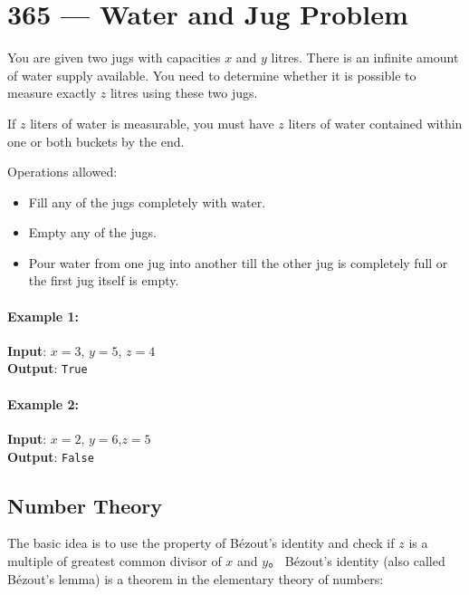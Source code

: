 \section{365 --- Water and Jug Problem}
You are given two jugs with capacities $ x $ and $ y $ litres. There is an infinite amount of water supply available. You need to determine whether it is possible to measure exactly $ z $ litres using these two jugs.

If $ z $ liters of water is measurable, you must have $ z $ liters of water contained within one or both buckets by the end.

Operations allowed:

\begin{itemize}
\item Fill any of the jugs completely with water.
\item Empty any of the jugs.
\item Pour water from one jug into another till the other jug is  completely full or the first jug itself is empty.
\end{itemize}

\paragraph{Example 1: }

\begin{flushleft}
\textbf{Input}: $ x = 3 $, $ y = 5 $, $ z = 4 $
\\
\textbf{Output}: \texttt{True}
\end{flushleft}

\paragraph{Example 2:}

\begin{flushleft}
\textbf{Input}: $ x = 2 $, $  y = 6 $,$  z = 5 $
\\
\textbf{Output}: \texttt{False}
\end{flushleft}

\subsection{Number Theory}
The basic idea is to use the property of B\'{e}zout's identity and check if $ z $ is a multiple of greatest common divisor of $ x $ and $ y $。  B\'{e}zout's identity (also called  B\'{e}zout's lemma) is a theorem in the elementary theory of numbers:


